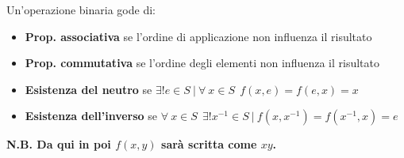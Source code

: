\documentclass{article}
\begin{document}
\noindent Un'operazione binaria gode di:
\begin{itemize}
    \item \textbf{Prop. associativa} se l’ordine di applicazione non influenza il risultato
    \item \textbf{Prop. commutativa} se l’ordine degli elementi non influenza il risultato
    \item \textbf{Esistenza del neutro} se $\exists!e\in S\ |\ \forall\ x\in S\ \  f(x,e)=f(e,x)=x$
    \item \textbf{Esistenza dell'inverso} se $\forall\ x\in S\ \  \exists!x^{-1}\in S \ |\  f(x,x^{-1})=f(x^{-1},x)=e$\newline
\end{itemize}

\noindent\textbf{N.B. Da qui in poi $f(x,y)$ sarà scritta come $xy$.}\newline
\end{document}
